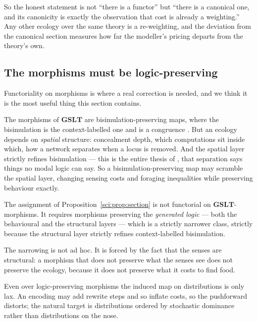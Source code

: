 So the honest statement is not ``there is a functor'' but ``there is a canonical one, and its
canonicity is exactly the observation that cost is already a weighting.'' Any other ecology over the
same theory is a re-weighting, and the deviation from the canonical section measures how far the
modeller's pricing departs from the theory's own.

\subsection{The morphisms must be logic-preserving}\label{sci:S15.3}

Functoriality on morphisms is where a real correction is needed, and we think it is the most useful
thing this section contains.

The morphisms of $\mathbf{GSLT}$ are bisimulation-preserving maps, where the bisimulation is the
context-labelled one and is a congruence \cite{Omnibus}. But an ecology depends on \emph{spatial}
structure: concealment depth, which computations sit inside which, how a network separates when a
locus is removed. And the spatial layer strictly refines bisimulation --- this is the entire thesis of
\cite{ClassifierNote}, that separation says things no modal logic can say. So a bisimulation-preserving
map may scramble the spatial layer, changing sensing costs and foraging inequalities while preserving
behaviour exactly.

\begin{proposition}
\label{sci:prop:morphisms}
The assignment of Proposition~\ref{sci:prop:section} is not functorial on $\mathbf{GSLT}$-morphisms. It requires
morphisms preserving the \emph{generated logic} --- both the behavioural and the structural layers ---
which is a strictly narrower class, strictly because the structural layer strictly refines
context-labelled bisimulation.
\end{proposition}

The narrowing is not ad hoc. It is forced by the fact that the senses are structural: a morphism that
does not preserve what the senses see does not preserve the ecology, because it does not preserve what
it costs to find food.

\begin{conjecture}[Laxity]
\label{sci:conj:lax}
Even over logic-preserving morphisms the induced map on distributions is only lax. An encoding may add
rewrite steps and so inflate costs, so the pushforward distorts; the natural target is distributions
ordered by stochastic dominance rather than distributions on the nose.
\end{conjecture}

